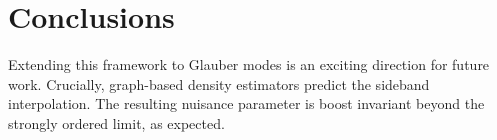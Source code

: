 \section{Conclusions}\label{sec:conclusions}

Extending this framework to Glauber modes is an exciting direction for
future work. Crucially, graph-based density estimators predict the
sideband interpolation. The resulting nuisance parameter is boost
invariant beyond the strongly ordered limit, as expected.

